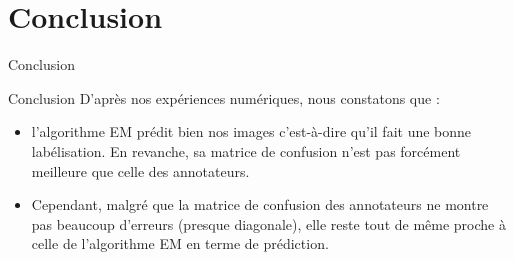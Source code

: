 \documentclass[11pt]{beamer}
\begin{document}
	\section{Conclusion}
	
	\begin{frame}{Conclusion}
		
		\begin{block}{Conclusion}
			D'après nos expériences numériques, nous constatons que :
			\begin{itemize}
				\item l'algorithme EM prédit bien nos images c'est-à-dire qu'il fait une bonne labélisation. En revanche, sa matrice de confusion n'est pas forcément meilleure que celle des annotateurs. 
				\item Cependant, malgré que la matrice de confusion des annotateurs ne montre pas beaucoup d'erreurs (presque diagonale), elle reste tout de même proche à celle de l'algorithme EM en terme de prédiction.
			\end{itemize}
			
		\end{block}
	\end{frame}
	
\end{document}
